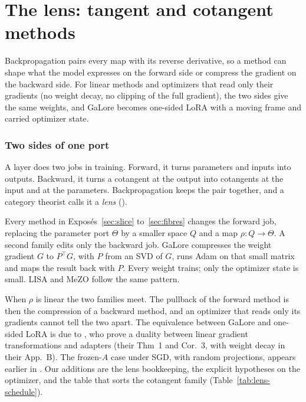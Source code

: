 \section{The lens: tangent and cotangent methods}\label{sec:lens}

Backpropagation pairs every map with its reverse derivative, so a method can shape what the model expresses on the
forward side or compress the gradient on the backward side. For linear methods and optimizers that read only their
gradients (no weight decay, no clipping of the full gradient), the two sides give the same weights, and GaLore becomes
one-sided LoRA with a moving frame and carried optimizer state.

\subsubsection{Two sides of one port}\label{sec:lens-hook}

A layer does two jobs in training. Forward, it turns parameters and inputs into outputs. Backward, it turns a cotangent
at the output into cotangents at the input and at the parameters. Backpropagation keeps the pair together, and a
category theorist calls it a \emph{lens} ().

Every method in Exposés~\ref{sec:slice} to~\ref{sec:fibres} changes the forward job, replacing the parameter port
$\Theta$ by a smaller space $Q$ and a map $\rho:Q\to\Theta$. A second family edits only the backward job. GaLore
\citep{zhao2024galore} compresses the weight gradient $G$ to $P^\top G$, with $P$ from an SVD of $G$, runs Adam on that
small matrix and maps the result back with $P$. Every weight trains; only the optimizer state is small. LISA
\citep{pan2024lisa} and MeZO \citep{malladi2023fine} follow the same pattern.

When $\rho$ is linear the two families meet. The pullback of the forward method is then the compression of a backward
method, and an optimizer that reads only its gradients cannot tell the two apart. The equivalence between GaLore and
one-sided LoRA is due to \citet{xtorrobahennigen2025duality}, who prove a duality between linear gradient
transformations and adapters (their Thm~1 and Cor.~3, with weight decay in their App.~B). The frozen-$A$ case under
SGD, with random projections, appears earlier in \citet{hao2024flora}. Our additions are the lens bookkeeping, the
explicit hypotheses on the optimizer, and the table that sorts the cotangent family
(Table~\ref{tab:lens-schedule}).

